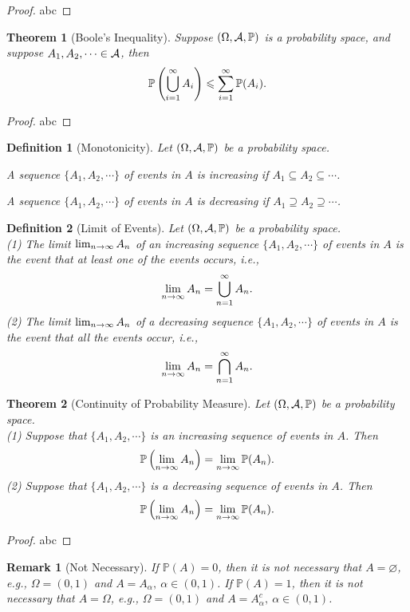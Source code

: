 \documentclass[openany,12pt]{book}
\newtheorem{theorem}{Theorem}[chapter]
\newtheorem{remark}{Remark}[chapter]
\newtheorem{definition}{Definition}[chapter]
\begin{document}
\begin{proof}
  abc
\end{proof}

\begin{theorem}[Boole's Inequality]
Suppose $(\Omega,\mathcal{A},\mathbb{P})$ is a probability space, and suppose $A_1,A_2,\cdots\in\mathcal{A}$, then 
$$\mathbb{P}\left(\bigcup_{i=1}^\infty A_i \right)\leqslant\sum_{i=1}^\infty \mathbb{P}(A_i ).$$
\end{theorem}

\begin{proof}
  abc
\end{proof}

\begin{definition}[Monotonicity]
  Let $(\Omega,\mathcal{A},\mathbb{P})$ be a probability space.

  A sequence $\{A_1,A_2,\cdots\}$ of events in $A$ is increasing if $A_1\subseteq A_2\subseteq\cdots$.

  A sequence $\{A_1,A_2,\cdots\}$ of events in $A$ is decreasing if $A_1\supseteq A_2\supseteq\cdots$.
\end{definition}

\begin{definition}[Limit of Events]
Let $(\Omega,\mathcal{A},\mathbb{P})$ be a probability space.\\
(1) The limit $\lim_{n\to\infty} A_n$ of an increasing sequence $\{A_1,A_2,\cdots\}$ of events in $A$ is the event that at least one of the events occurs, i.e., $$\lim_{n\to\infty} A_n=\bigcup_{n=1}^\infty A_n.$$
(2) The limit $\lim_{n\to\infty} A_n$ of a decreasing sequence $\{A_1,A_2,\cdots\}$ of events in $A$ is the event that all the events occur, i.e., $$\lim_{n\to\infty} A_n=\bigcap_{n=1}^\infty A_n.$$
\end{definition}

\begin{theorem}[Continuity of Probability Measure]
Let $(\Omega,\mathcal{A},\mathbb{P})$ be a probability space.\\
(1) Suppose that $\{A_1,A_2,\cdots\}$ is an increasing sequence of events in $A$. Then $$\mathbb{P}\left(\lim_{n\to\infty} A_n\right)=\lim_{n\to\infty} \mathbb{P}(A_n).$$
(2) Suppose that $\{A_1,A_2,\cdots\}$ is a decreasing sequence of events in $A$. Then $$\mathbb{P}\left(\lim_{n\to\infty} A_n\right)=\lim_{n\to\infty} \mathbb{P}(A_n).$$
\end{theorem}

\begin{proof}
  abc
\end{proof}

\begin{remark}[Not Necessary]
If $\mathbb{P}(A)=0$, then it is not necessary that $A=\varnothing$, e.g., $\Omega=(0,1)$ and $A=A_\alpha,\ \alpha\in(0,1)$.
If $\mathbb{P}(A)=1$, then it is not necessary that $A=\Omega$, e.g., $\Omega=(0,1)$ and $A=A_\alpha^c,\ \alpha\in(0,1)$.
\end{remark}
\end{document}
